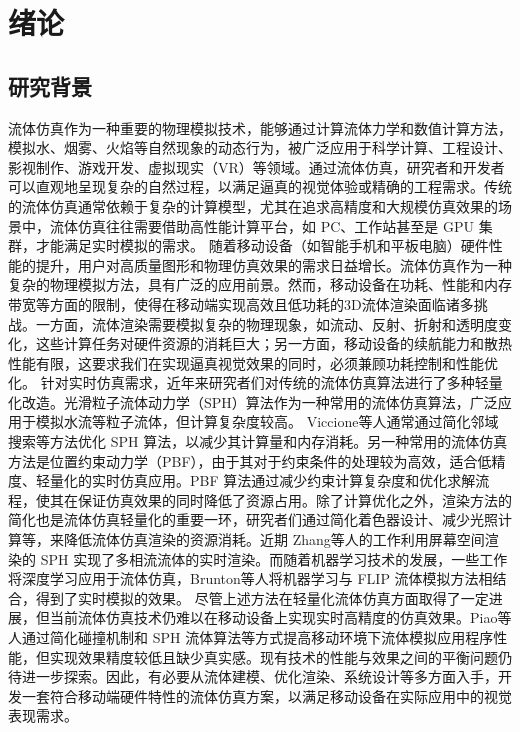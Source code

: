 
\chapter{绪论}

\section{研究背景}

\indent 流体仿真作为一种重要的物理模拟技术，能够通过计算流体力学和数值计算方法，模拟水、烟雾、火焰等自然现象的动态行为，被广泛应用于科学计算、工程设计、影视制作、游戏开发、虚拟现实（VR）等领域。通过流体仿真，研究者和开发者可以直观地呈现复杂的自然过程，以满足逼真的视觉体验或精确的工程需求。传统的流体仿真通常依赖于复杂的计算模型，尤其在追求高精度和大规模仿真效果的场景中，流体仿真往往需要借助高性能计算平台，如 PC、工作站甚至是 GPU 集群\cite{kipfer2004uberflow}，才能满足实时模拟的需求。
\newline
\indent 随着移动设备（如智能手机和平板电脑）硬件性能的提升，用户对高质量图形和物理仿真效果的需求日益增长。流体仿真作为一种复杂的物理模拟方法，具有广泛的应用前景。然而，移动设备在功耗、性能和内存带宽等方面的限制，使得在移动端实现高效且低功耗的3D流体渲染面临诸多挑战。一方面，流体渲染需要模拟复杂的物理现象，如流动、反射、折射和透明度变化，这些计算任务对硬件资源的消耗巨大；另一方面，移动设备的续航能力和散热性能有限，这要求我们在实现逼真视觉效果的同时，必须兼顾功耗控制和性能优化。
\newline
\indent 针对实时仿真需求，近年来研究者们对传统的流体仿真算法进行了多种轻量化改造。光滑粒子流体动力学（SPH）算法\cite{muller2003particle}作为一种常用的流体仿真算法，广泛应用于模拟水流等粒子流体，但计算复杂度较高。 Viccione\cite{viccione2008defining}等人通常通过简化邻域搜索等方法优化 SPH 算法，以减少其计算量和内存消耗。另一种常用的流体仿真方法是位置约束动力学（PBF）\cite{macklin2013position}，由于其对于约束条件的处理较为高效，适合低精度、轻量化的实时仿真应用。PBF 算法通过减少约束计算复杂度和优化求解流程，使其在保证仿真效果的同时降低了资源占用。除了计算优化之外，渲染方法的简化也是流体仿真轻量化的重要一环，研究者们通过简化着色器设计、减少光照计算\cite{kunimatsu2001fast}等，来降低流体仿真渲染的资源消耗。近期 Zhang\cite{zhang2024real}等人的工作利用屏幕空间渲染的 SPH 实现了多相流流体的实时渲染。而随着机器学习技术的发展，一些工作将深度学习应用于流体仿真\cite{brunton2020machine}，Brunton\cite{pack2018toward}等人将机器学习与 FLIP 流体模拟方法相结合，得到了实时模拟的效果。
\newline
\indent 尽管上述方法在轻量化流体仿真方面取得了一定进展，但当前流体仿真技术仍难以在移动设备上实现实时高精度的仿真效果\cite{wudeyang2020fluid}。Piao\cite{piao2017lightweight}等人通过简化碰撞机制和 SPH 流体算法等方式提高移动环境下流体模拟应用程序性能，但实现效果精度较低且缺少真实感。现有技术的性能与效果之间的平衡问题仍待进一步探索。因此，有必要从流体建模、优化渲染、系统设计等多方面入手，开发一套符合移动端硬件特性的流体仿真方案，以满足移动设备在实际应用中的视觉表现需求。

